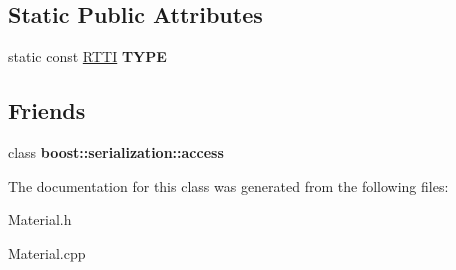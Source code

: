 \subsection*{Static Public Attributes}
\begin{DoxyCompactItemize}
\item 
\hypertarget{class_material_a2ce292caf29777172f41f1e2cfa3f4de}{
static const \hyperlink{class_r_t_t_i}{RTTI} {\bfseries TYPE}}
\label{class_material_a2ce292caf29777172f41f1e2cfa3f4de}

\end{DoxyCompactItemize}
\subsection*{Friends}
\begin{DoxyCompactItemize}
\item 
\hypertarget{class_material_ac98d07dd8f7b70e16ccb9a01abf56b9c}{
class {\bfseries boost::serialization::access}}
\label{class_material_ac98d07dd8f7b70e16ccb9a01abf56b9c}

\end{DoxyCompactItemize}


The documentation for this class was generated from the following files:\begin{DoxyCompactItemize}
\item 
Material.h\item 
Material.cpp\end{DoxyCompactItemize}
